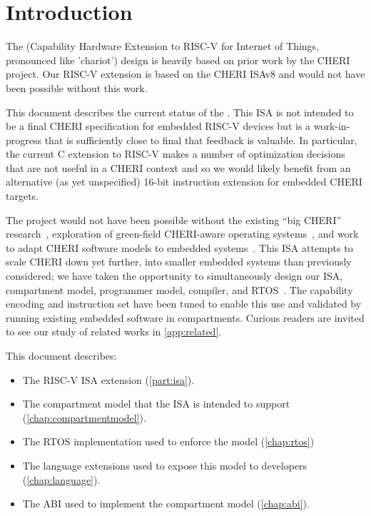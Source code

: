 \chapter{Introduction}

The \cherimcu{} (Capability Hardware Extension to RISC-V for Internet of Things, pronounced like 'chariot') design is heavily based on prior work by the CHERI project.
Our RISC-V extension is based on the CHERI ISAv8\cite{UCAM-CL-TR-951} and would not have been possible without this work.

This document describes the current status of the \cherimcuisa{}.
This ISA is not intended to be a final CHERI specification for embedded RISC-V devices but is a work-in-progress that is sufficiently close to final that feedback is valuable.
In particular, the current C extension to RISC-V makes a number of optimization decisions that are not useful in a CHERI context and so we would likely benefit from an alternative (as yet unspecified) 16-bit instruction extension for embedded CHERI targets.

The \cherimcu{} project would not have been possible without the existing ``big CHERI'' research~\cite{UCAM-CL-TR-951,Davis_CheriABIEnforcingValid_2019},
exploration of green-field CHERI-aware operating systems~\cite{esswood:cherios},
and work to adapt CHERI software models to embedded systems~\cite{xia:cherirtos,xia:capprotembed,almatary:compartos,almatary:thesis}.
This ISA attempts to scale CHERI down yet further, into smaller embedded systems than previously considered;
we have taken the opportunity to simultaneously design our ISA, compartment model, programmer model, compiler, and RTOS~\cite{cheriot-rtos}.
The capability encoding and instruction set have been tuned to enable this use and validated by running existing embedded software in compartments.
Curious readers are invited to see our study of related works in \cref{app:related}.

This document describes:

\begin{itemize}
	\item The RISC-V ISA extension (\cref{part:isa}).
	\item The compartment model that the ISA is intended to support (\cref{chap:compartmentmodel}).
	\item The RTOS implementation used to enforce the model (\cref{chap:rtos})
	\item The language extensions used to expose this model to developers (\cref{chap:language}).
	\item The ABI used to implement the compartment model (\cref{chap:abi}).
\end{itemize}

